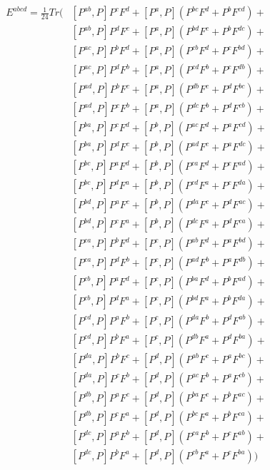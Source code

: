 \documentclass[prl,aps,twocolumn,showpacs,twocolumngrid,superbib]{revtex4}
\begin{document}
\begin{equation}
\begin{split}
E^{abcd}=\frac{1}{24}Tr(&[P^{ab},P] P^c F^d +[P^a,P](P^{bc} F^d + P^b F^{cd})+\\
                        &[P^{ab},P] P^d F^c +[P^a,P](P^{bd} F^c + P^b F^{dc})+\\
                        &[P^{ac},P] P^b F^d +[P^a,P](P^{cb} F^d + P^c F^{bd})+\\
                        &[P^{ac},P] P^d F^b +[P^a,P](P^{cd} F^b + P^c F^{db})+\\
                        &[P^{ad},P] P^b F^c +[P^a,P](P^{db} F^c + P^d F^{bc})+\\
                        &[P^{ad},P] P^c F^b +[P^a,P](P^{dc} F^b + P^d F^{cb})+\\
%
                        &[P^{ba},P] P^c F^d +[P^b,P](P^{ac} F^d + P^a F^{cd})+\\
                        &[P^{ba},P] P^d F^c +[P^b,P](P^{ad} F^c + P^a F^{dc})+\\
                        &[P^{bc},P] P^a F^d +[P^b,P](P^{ca} F^d + P^c F^{ad})+\\
                        &[P^{bc},P] P^d F^a +[P^b,P](P^{cd} F^a + P^c F^{da})+\\
                        &[P^{bd},P] P^a F^c +[P^b,P](P^{da} F^c + P^d F^{ac})+\\
                        &[P^{bd},P] P^c F^a +[P^b,P](P^{dc} F^a + P^d F^{ca})+\\
%
                        &[P^{ca},P] P^b F^d +[P^c,P](P^{ab} F^d + P^a F^{bd})+\\
                        &[P^{ca},P] P^d F^b +[P^c,P](P^{ad} F^b + P^a F^{db})+\\
                        &[P^{cb},P] P^a F^d +[P^c,P](P^{ba} F^d + P^b F^{ad})+\\
                        &[P^{cb},P] P^d F^a +[P^c,P](P^{bd} F^a + P^b F^{da})+\\
                        &[P^{cd},P] P^a F^b +[P^c,P](P^{da} F^b + P^d F^{ab})+\\
                        &[P^{cd},P] P^b F^a +[P^c,P](P^{db} F^a + P^d F^{ba})+\\
%
                        &[P^{da},P] P^b F^c +[P^d,P](P^{ab} F^c + P^a F^{bc})+\\
                        &[P^{da},P] P^c F^b +[P^d,P](P^{ac} F^b + P^a F^{cb})+\\
                        &[P^{db},P] P^a F^c +[P^d,P](P^{ba} F^c + P^b F^{ac})+\\
                        &[P^{db},P] P^c F^a +[P^d,P](P^{bc} F^a + P^b F^{ca})+\\
                        &[P^{dc},P] P^a F^b +[P^d,P](P^{ca} F^b + P^c F^{ab})+\\
                        &[P^{dc},P] P^b F^a +[P^d,P](P^{cb} F^a + P^c F^{ba}))\\
\end{split}
\end{equation}
\end{document}
